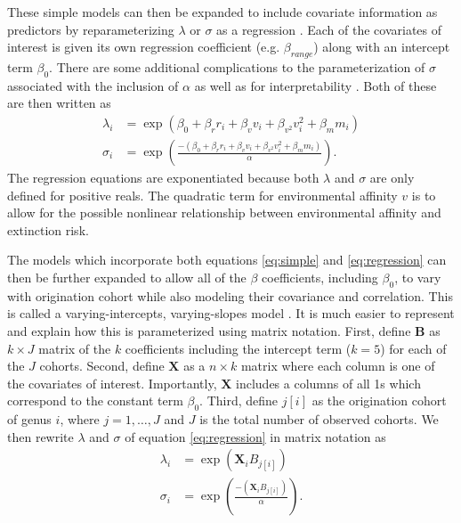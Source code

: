 \documentclass[12pt,letterpaper]{article}
\begin{document}
These simple models can then be expanded to include covariate information as predictors by reparameterizing \(\lambda\) or \(\sigma\) as a regression \citep{Klein2003}. Each of the covariates of interest is given its own regression coefficient (e.g. \(\beta_{range}\)) along with an intercept term \(\beta_{0}\). There are some additional complications to the parameterization of \(\sigma\) associated with the inclusion of \(\alpha\) as well as for interpretability \citep{Klein2003}. Both of these are then written as
\begin{equation}
  \begin{aligned}
    \lambda_{i} &= \exp(\beta_{0} + \beta_{r} r_{i} + \beta_{v} v_{i} + \beta_{v^{2}} v_{i}^{2} + \beta_{m} m_{i}) \\
    \sigma_{i} &= \exp\left(\frac{-(\beta_{0} + \beta_{r} r_{i} + \beta_{v} v_{i} + \beta_{v^{2}} v_{i}^{2} + \beta_{m} m_{i})}{\alpha}\right).
  \end{aligned}
  \label{eq:regression}
\end{equation}
The regression equations are exponentiated because both \(\lambda\) and \(\sigma\) are only defined for positive reals. The quadratic term for environmental affinity \(v\) is to allow for the possible nonlinear relationship between environmental affinity and extinction risk.

The models which incorporate both equations \ref{eq:simple} and \ref{eq:regression} can then be further expanded to allow all of the \(\beta\) coefficients, including \(\beta_{0}\), to vary with origination cohort while also modeling their covariance and correlation. This is called a varying-intercepts, varying-slopes model \citep{Gelman2007}. It is much easier to represent and explain how this is parameterized using matrix notation. First, define \(\mathbf{B}\) as \(k \times J\) matrix of the \(k\) coefficients including the intercept term (\(k = 5\)) for each of the \(J\) cohorts. Second, define \(\mathbf{X}\) as a \(n \times k\) matrix where each column is one of the covariates of interest. Importantly, \(\mathbf{X}\) includes a columns of all 1s which correspond to the constant term \(\beta_{0}\). Third, define \(j[i]\) as the origination cohort of genus \(i\), where \(j = 1, \dots, J\) and \(J\) is the total number of observed cohorts. We then rewrite \(\lambda\) and \(\sigma\) of equation \ref{eq:regression} in matrix notation as
\begin{equation}
  \begin{aligned}
    \lambda_{i} &= \exp(\mathbf{X}_{i} B_{j[i]}) \\
    \sigma_{i} &= \exp\left(\frac{-(\mathbf{X}_{i} B_{j[i]})}{\alpha}\right). 
  \end{aligned}
  \label{eq:multivariate}
\end{equation}
\end{document}
